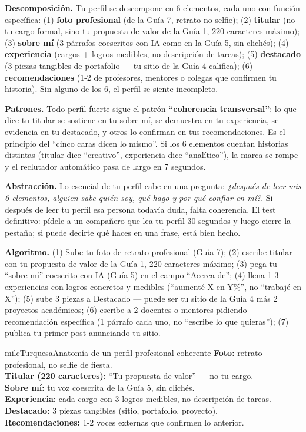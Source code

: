 \documentclass[11pt,letterpaper]{article}
\newcommand{\milcpaso}[3]{%
\Needspace{4\baselineskip}%
\begin{tcolorbox}[enhanced,colback=white,colframe=milcLinea,arc=1.5mm,boxrule=.9pt,
  left=14mm,right=4mm,top=3mm,bottom=3mm,before skip=4pt,after skip=4pt,
  fontupper=\RaggedRight,
  overlay={\node[anchor=north west,circle,fill=#2,text=white,inner sep=0pt,
    minimum size=7.4mm,font=\sffamily\bfseries\small]
    at ([xshift=3.6mm,yshift=-3.2mm]frame.north west) {#1};}]
#3
\end{tcolorbox}}
\begin{document}
\milcpaso{1}{milcTurquesa}{\textbf{Descomposición.} Tu perfil se descompone en 6 elementos, cada uno con función específica: (1) \textbf{foto profesional} (de la Guía 7, retrato no selfie); (2) \textbf{titular} (no tu cargo formal, sino tu propuesta de valor de la Guía 1, 220 caracteres máximo); (3) \textbf{sobre mí} (3 párrafos coescritos con IA como en la Guía 5, sin clichés); (4) \textbf{experiencia} (cargos + logros medibles, no descripción de tareas); (5) \textbf{destacado} (3 piezas tangibles de portafolio --- tu sitio de la Guía 4 califica); (6) \textbf{recomendaciones} (1-2 de profesores, mentores o colegas que confirmen tu historia). Sin alguno de los 6, el perfil se siente incompleto.}
\milcpaso{2}{milcTurquesa}{\textbf{Patrones.} Todo perfil fuerte sigue el patrón \textbf{``coherencia transversal''}: lo que dice tu titular se sostiene en tu sobre mí, se demuestra en tu experiencia, se evidencia en tu destacado, y otros lo confirman en tus recomendaciones. Es el principio del ``cinco caras dicen lo mismo''. Si los 6 elementos cuentan historias distintas (titular dice ``creativo'', experiencia dice ``analítico''), la marca se rompe y el reclutador automático pasa de largo en 7 segundos.}
\milcpaso{3}{milcTurquesa}{\textbf{Abstracción.} Lo esencial de tu perfil cabe en una pregunta: \emph{¿después de leer mis 6 elementos, alguien sabe quién soy, qué hago y por qué confiar en mí?}. Si después de leer tu perfil esa persona todavía duda, falta coherencia. El test definitivo: pídele a un compañero que lea tu perfil 30 segundos y luego cierre la pestaña; si puede decirte qué haces en una frase, está bien hecho.}
\milcpaso{4}{milcTurquesa}{\textbf{Algoritmo.} (1) Sube tu foto de retrato profesional (Guía 7); (2) escribe titular con tu propuesta de valor de la Guía 1, 220 caracteres máximo; (3) pega tu ``sobre mí'' coescrito con IA (Guía 5) en el campo ``Acerca de''; (4) llena 1-3 experiencias con logros concretos y medibles (``aumenté X en Y\%'', no ``trabajé en X''); (5) sube 3 piezas a Destacado --- puede ser tu sitio de la Guía 4 más 2 proyectos académicos; (6) escribe a 2 docentes o mentores pidiendo recomendación específica (1 párrafo cada uno, no ``escribe lo que quieras''); (7) publica tu primer post anunciando tu sitio.}

\begin{drawbox}{milcTurquesa}{Anatomía de un perfil profesional coherente}
\textbf{Foto:} retrato profesional, no selfie de fiesta. \\[1mm] \textbf{Titular (220 caracteres):} ``Tu propuesta de valor'' --- no tu cargo. \\[1mm] \textbf{Sobre mí:} tu voz coescrita de la Guía 5, sin clichés. \\[1mm] \textbf{Experiencia:} cada cargo con 3 logros medibles, no descripción de tareas. \\[1mm] \textbf{Destacado:} 3 piezas tangibles (sitio, portafolio, proyecto). \\[1mm] \textbf{Recomendaciones:} 1-2 voces externas que confirmen lo anterior.
\end{drawbox}
\end{document}
